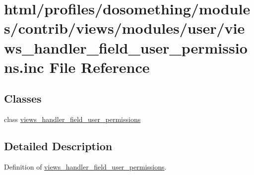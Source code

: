 \hypertarget{views__handler__field__user__permissions_8inc}{
\section{html/profiles/dosomething/modules/contrib/views/modules/user/views\_\-handler\_\-field\_\-user\_\-permissions.inc File Reference}
\label{views__handler__field__user__permissions_8inc}
}
\subsection*{Classes}
\begin{DoxyCompactItemize}
\item 
class \hyperlink{classviews__handler__field__user__permissions}{views\_\-handler\_\-field\_\-user\_\-permissions}
\end{DoxyCompactItemize}


\subsection{Detailed Description}
Definition of \hyperlink{classviews__handler__field__user__permissions}{views\_\-handler\_\-field\_\-user\_\-permissions}. 